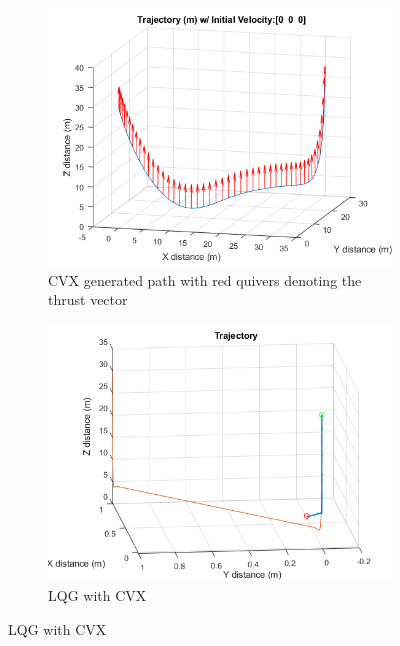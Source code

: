 \documentclass[conf]{new-aiaa}
\begin{document}
\begin{doublespace}
\begin{singlespace}
\begin{figure}[!htpb]
\begin{subfigure}{.5\textwidth}
  \centering
  \includegraphics[scale= 0.6]{cvx_path.png}
  \caption{CVX generated path with red quivers denoting the thrust vector}
  \label{CVXpath}
\end{subfigure}%
\begin{subfigure}{.5\textwidth}
  \centering
  \includegraphics[scale= 0.5]{uhoh.png}
  \caption{LQG with CVX}
  \label{LQGcvx}
\end{subfigure}%
\end{figure}
\end{singlespace}






\end{doublespace}
\end{document}
